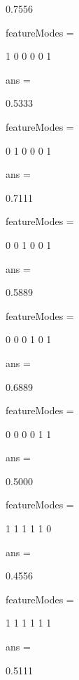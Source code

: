     0.7556

featureModes =

     1     0     0     0     0     1


ans =

    0.5333


featureModes =

     0     1     0     0     0     1


ans =

    0.7111


featureModes =

     0     0     1     0     0     1


ans =

    0.5889


featureModes =

     0     0     0     1     0     1


ans =

    0.6889


featureModes =

     0     0     0     0     1     1


ans =

    0.5000


featureModes =

     1     1     1     1     1     0


ans =

    0.4556


featureModes =

     1     1     1     1     1     1


ans =

    0.5111